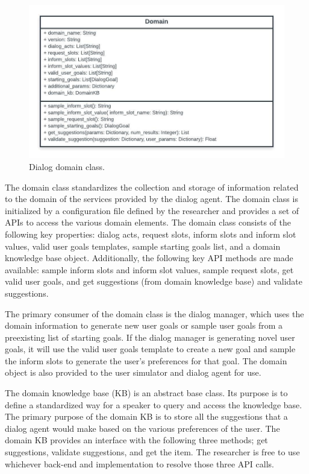 \begin{figure}[h!]
	\centering
	\includegraphics[scale=.9]{diagrams/domain_class.jpeg}
	\caption{ Dialog domain class. }
	\label{fig:domain_class}
\end{figure}

The domain class standardizes the collection and storage of information related to the domain of the services provided by the dialog agent. The domain class is initialized by a configuration file defined by the researcher and provides a set of APIs to access the various domain elements. The domain class consists of the following key properties: dialog acts, request slots, inform slots and inform slot values, valid user goals templates, sample starting goals list, and a domain knowledge base object.  Additionally, the following key API methods are made available: sample inform slots and inform slot values, sample request slots, get valid user goals, and get suggestions (from domain knowledge base) and validate suggestions. 

The primary consumer of the domain class is the dialog manager, which uses the domain information to generate new user goals or sample user goals from a preexisting list of starting goals. If the dialog manager is generating novel user goals, it will use the valid user goals template to create a new goal and sample the inform slots to generate the user's preferences for that goal. The domain object is also provided to the user simulator and dialog agent for use. 

The domain knowledge base (KB) is an abstract base class. Its purpose is to define a standardized way for a speaker to query and access the knowledge base. The primary purpose of the domain KB is to store all the suggestions that a dialog agent would make based on the various preferences of the user. The domain KB provides an interface with the following three methods; get suggestions, validate suggestions, and get the item. The researcher is free to use whichever back-end and implementation to resolve those three API calls. 

